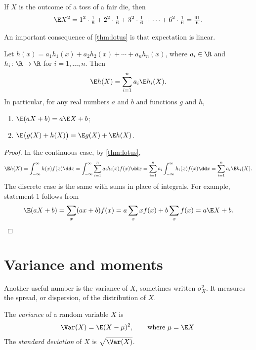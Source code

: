 \begin{example}\label{ex:expected-square-die}
If $X$ is the outcome of a toss of a fair die, then
\[
  \E X^2 = 1^2 \cdot \tfrac16 + 2^2 \cdot \tfrac16 + 3^2 \cdot \tfrac16 + \cdots + 6^2 \cdot \tfrac16 = \tfrac{91}{6}.
\]
\end{example}

An important consequence of \cref{thm:lotus} is that expectation is linear.

\begin{theorem}\label{thm:linearity-single}
Let $h(x) = a_1 h_1(x) + a_2 h_2(x) + \cdots + a_n h_n(x)$, where $a_i \in \R$ and $h_i \colon \R \to \R$ for $i = 1, \ldots, n$. Then
\[
  \E h(X) = \sum_{i=1}^n a_i \E h_i(X).
\]
In particular, for any real numbers $a$ and $b$ and functions $g$ and $h$,
\begin{enumerate}
  \item $\E(aX + b) = a \E X + b$;
  \item $\E\bigl(g(X) + h(X)\bigr) = \E g(X) + \E h(X)$.
\end{enumerate}
\end{theorem}

\begin{proof}
In the continuous case, by \cref{thm:lotus},
\[
  \E h(X) = \int_{-\infty}^{\infty} h(x) f(x) \dd x = \int_{-\infty}^{\infty} \sum_{i=1}^n a_i h_i(x) f(x) \dd x = \sum_{i=1}^n a_i \int_{-\infty}^{\infty} h_i(x) f(x) \dd x = \sum_{i=1}^n a_i \E h_i(X).
\]
The discrete case is the same with sums in place of integrals. For example, statement 1 follows from
\[
  \E(aX + b) = \sum_x (ax + b) f(x) = a \sum_x x f(x) + b \sum_x f(x) = a \E X + b. \qedhere
\]
\end{proof}

\section{Variance and moments}\label{sec:variance-moments}

Another useful number is the variance of $X$, sometimes written $\sigma_X^2$. It measures the spread, or dispersion, of the distribution of $X$.

\begin{definition}\label{def:variance}
The \emph{variance} of a random variable $X$ is
\[
  \Var(X) = \E(X - \mu)^2, \qquad \text{where } \mu = \E X.
\]
The \emph{standard deviation} of $X$ is $\sqrt{\Var(X)}$.
\end{definition}

